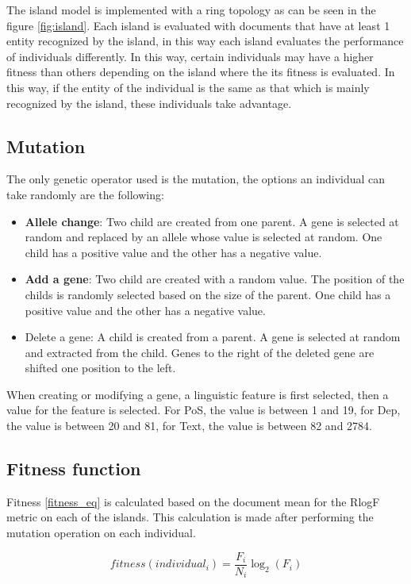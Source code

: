 The island model is implemented with a ring topology as can be seen in the figure \ref{fig:island}. Each island is evaluated with documents that have at least 1 entity recognized by the island, in this way each island evaluates the performance of individuals differently. In this way, certain individuals may have a higher fitness than others depending on the island where the its fitness is evaluated. In this way, if the entity of the individual is the same as that which is mainly recognized by the island, these individuals take advantage.

\subsection{Mutation}

The only genetic operator used is the mutation, the options an individual can take randomly are the following:

\begin{itemize}
  \item \textbf{Allele change}: Two child are created from one parent. A gene is selected at random and replaced by an allele whose value is selected at random. One child has a positive value and the other has a negative value.
  \item \textbf{Add a gene}: Two child are created with a random value. The position of the childs is randomly selected based on the size of the parent. One child has a positive value and the other has a negative value.
  \item Delete a gene: A child is created from a parent. A gene is selected at random and extracted from the child. Genes to the right of the deleted gene are shifted one position to the left.
\end{itemize}
When creating or modifying a gene, a linguistic feature is first selected, then a value for the feature is selected. For PoS, the value is between 1 and 19, for Dep, the value is between 20 and 81, for Text, the value is between 82 and 2784.


\subsection{Fitness function}

Fitness \ref{fitness_eq} is calculated based on the document mean for the RlogF metric\cite{seman_lex} on each of the islands. This calculation is made after performing the mutation operation on each individual.

\begin{equation}
  \label{fitness_eq}
  fitness(individual_i) = \frac{F_i}{N_i} {\log_2}({F_i})
\end{equation}

